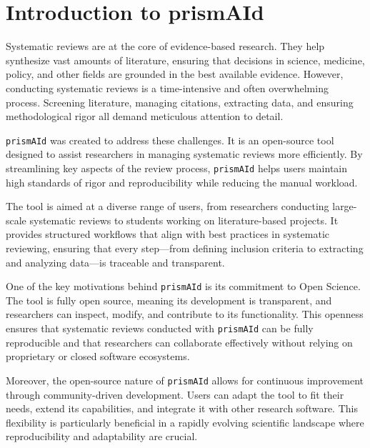 \chapter{Introduction to prismAId} 
\label{chap:intro}

Systematic reviews are at the core of evidence-based research. They help synthesize vast amounts of literature, ensuring that decisions in science, medicine, policy, and other fields are grounded in the best available evidence. However, conducting systematic reviews is a time-intensive and often overwhelming process. Screening literature, managing citations, extracting data, and ensuring methodological rigor all demand meticulous attention to detail.

\texttt{prismAId} was created to address these challenges. It is an open-source tool designed to assist researchers in managing systematic reviews more efficiently. By streamlining key aspects of the review process, \texttt{prismAId} helps users maintain high standards of rigor and reproducibility while reducing the manual workload.

The tool is aimed at a diverse range of users, from researchers conducting large-scale systematic reviews to students working on literature-based projects. It provides structured workflows that align with best practices in systematic reviewing, ensuring that every step—from defining inclusion criteria to extracting and analyzing data—is traceable and transparent.

\bigskip

One of the key motivations behind \texttt{prismAId} is its commitment to Open Science. The tool is fully open source, meaning its development is transparent, and researchers can inspect, modify, and contribute to its functionality. This openness ensures that systematic reviews conducted with \texttt{prismAId} can be fully reproducible and that researchers can collaborate effectively without relying on proprietary or closed software ecosystems.

Moreover, the open-source nature of \texttt{prismAId} allows for continuous improvement through community-driven development. Users can adapt the tool to fit their needs, extend its capabilities, and integrate it with other research software. This flexibility is particularly beneficial in a rapidly evolving scientific landscape where reproducibility and adaptability are crucial.

